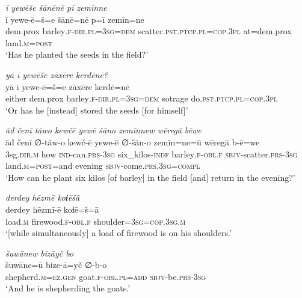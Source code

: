 \ea \label{ŽP.44}
\textit{ī yewēše šānēnē pī zemīnne} \\ 
\gll ī yewe-ē=š=e šānē=nē p=ī zemīn=ne \\ 
 dem.prox barley\textsc{.f}\textsc{-dir}\textsc{.pl}\textsc{=3sg}\textsc{=dem} scatter\textsc{.pst}\textsc{.ptcp}\textsc{.pl}\textsc{=cop}\textsc{.3pl} at=dem.prox land\textsc{.m}\textsc{=\textsc{post}} \\ 
\glt `Has he planted the seeds in the field?'
\z 
 
\ea \label{ŽP.45}
\textit{yā ī yewēše zāxēre kerdēnē?} \\ 
\gll yā ī yewe-ē=š=e zāxēre kerdē=nē \\ 
 either dem.prox barley\textsc{.f}\textsc{-dir}\textsc{.pl}\textsc{=3sg}\textsc{=dem} sotrage do\textsc{.pst}\textsc{.ptcp}\textsc{.pl}\textsc{=cop}\textsc{.3pl} \\ 
\glt `Or has he [instead] stored the seeds [for himself]'
\z 
 
\ea \label{ŽP.46}
\textit{āđ čenī tāwo kewčē yewē šāno zemīnnew wēregā bēwe} \\ 
\gll āđ čenī ∅-tāw-o kewč-ē yewe-ē ∅-šān-o zemīn=ne=ū wēregā b-ē=we \\ 
 3sg\textsc{.dir}\textsc{.m} how \textsc{ind-}can\textsc{.prs}\textsc{-3sg} six\_kilos\textsc{-indf} barley\textsc{.f}\textsc{-obl}\textsc{.f} \textsc{sbjv-}scatter\textsc{.prs}\textsc{-3sg} land\textsc{.m}\textsc{=\textsc{post}}=and evening \textsc{sbjv-}come\textsc{.prs}\textsc{.3sg}\textsc{=compl} \\ 
\glt `How can he plant six kilos [of barley] in the field [and] return in the evening?'
\z 
 
\ea \label{ŽP.47}
\textit{derdey hēzmē koɫēšā} \\ 
\gll derdey hēzmī-ē koɫē=š=ā \\ 
 load\textsc{.m} firewood\textsc{.f}\textsc{-obl}\textsc{.f} shoulder\textsc{=3sg}\textsc{=cop}\textsc{.3sg}\textsc{.m} \\ 
\glt `[while simultaneously] a load of firewood is on his shoulders.'
\z 
 
\ea \label{ŽP.48}
\textit{šuwānew bizāyč bo} \\ 
\gll šuwāne=ū bize-ā=yč ∅-b-o \\ 
 shepherd\textsc{.m}\textsc{\textsc{=ez.gen}} goat\textsc{.f}\textsc{-obl}\textsc{.pl}\textsc{=add} \textsc{sbjv-}be\textsc{.prs}\textsc{-3sg} \\ 
\glt `And he is shepherding the goats.'
\z 
 
